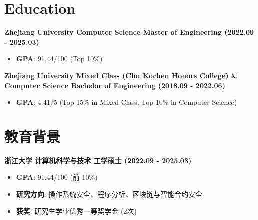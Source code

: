 \ifdefined\english

    \section*{Education}

    \noindent\textbf{Zhejiang University \textbar{} Computer Science \textbar{} Master of Engineering (2022.09 - 2025.03)}

    \begin{itemize}
        \item \textbf{GPA}: 91.44/100 (Top 10\%)
    \end{itemize}

    \noindent\textbf{Zhejiang University \textbar{} Mixed Class (Chu Kochen Honors College) \& Computer Science \textbar{} Bachelor of Engineering (2018.09 - 2022.06)}

    \begin{itemize}
        \item \textbf{GPA}: 4.41/5 (Top 15\% in Mixed Class, Top 10\% in Computer Science)
    \end{itemize}

\else

    \section*{教育背景}

    \noindent\textbf{浙江大学 \textbar{} 计算机科学与技术 \textbar{} 工学硕士 (2022.09 - 2025.03)}

    \begin{itemize}
        \item \textbf{GPA}: 91.44/100 (前 10\%)
        \item \textbf{研究方向}: 操作系统安全、程序分析、区块链与智能合约安全
        \item \textbf{获奖}: 研究生学业优秀一等奖学金 (2次)
    \end{itemize}

